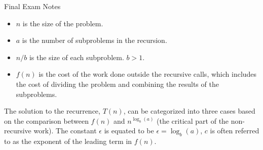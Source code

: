 \begin{examnotes}{Final Exam Notes}
\begin{highlight}
        \begin{itemize}
            \item $n$ is the size of the problem.
            \item $a$ is the number of subproblems in the recursion.
            \item $n / b$ is the size of each subproblem. $b > 1$.
            \item $f(n)$ is the cost of the work done outside the recursive calls, which includes the cost of dividing the problem and combining the results of the subproblems.
        \end{itemize}
        The solution to the recurrence, $T(n)$, can be categorized into three cases based on the comparison between $f(n)$ and $n^{\log_{b}{(a)}}$ (the critical part of the non-recursive work). The
        constant $\epsilon$ is equated to be $\epsilon = \log_{b}{(a)}$, $c$ is often referred to as the exponent of the leading term in $f(n)$.


\end{highlight}
\end{examnotes}
